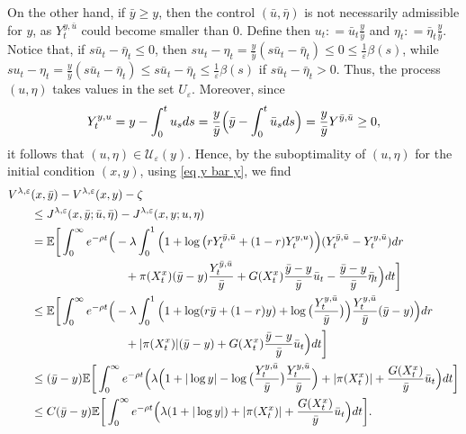 \documentclass[11pt]{amsart}
\theoremstyle{plain}
\def \dd{{\rm d}}
\numberwithin{equation}{section}
\begin{document}
On the other hand, if $\bar y \geq y$, then the control $( \bar u, \bar \eta)$ is not necessarily admissible for $y$, as $Y_t^{y,\bar u}$ could become smaller than 0. 
Define then $u_t: = \bar u_t \frac{y}{\bar y}$ and $\eta_t: = \bar \eta_t \frac{y}{\bar y}$. 
Notice that, if $s\bar u_t - \bar \eta _t \leq 0$, then $s u_t - \eta_t = \frac{y}{\bar y} ( s\bar u_t - \bar \eta_t) \leq 0 \leq \frac 1 \varepsilon \beta(s)$, while  $s u_t - \eta_t = \frac{y}{\bar y} ( s\bar u_t - \bar \eta_t) \leq s\bar u_t - \bar \eta_t \leq \frac 1 \varepsilon \beta(s)$ if $s\bar u_t - \bar \eta_t > 0$.
Thus, the process $(u,\eta) $ takes values in the set $ U _\varepsilon$. 
Moreover, since 
\begin{equation}\label{eq y bar y}
    Y^{y,u}_t = y- \int_0^t u_s \dd s = \frac{y}{\bar y} \Big( \bar y- \int_0^t \bar u_s \dd s \Big) = \frac{y}{\bar y}Y^{\bar y, \bar u} \geq 0,
\end{equation}
it follows that $(u,\eta) \in \mathcal U _\varepsilon (y)$.
Hence, by the suboptimality of $(u,\eta)$ for the initial condition $(x,y)$, using \eqref{eq y bar y}, we find
\begin{equation}\label{eq proof Lip y GIorgio}
\begin{aligned}
V^{\lambda, \varepsilon}&( x, \bar y) - V^{\lambda, \varepsilon}(x,y) - \zeta \\
& \leq J^{\lambda, \varepsilon}( x, \bar y;\bar u, \bar \eta ) - J^{\lambda, \varepsilon}(x,y;  u , \eta) \\
&  = \mathbb E  \bigg[\int_0^\infty e ^{-\rho t} \Big( - \lambda \int_0^1 \Big(1+ \log \big(  r  Y^{\bar y,\bar u}_t   + (1-r)Y^{y,  u}_t \big) \Big)  ( Y^{\bar y,\bar u}_t  - Y^{y, \bar u}_t ) \dd r \\ 
& \quad \quad \quad \quad \quad \quad \quad \quad  +\pi (X_t^{ x}) (\bar y - y) \frac{Y_t^{\bar y, \bar u}}{\bar y} + G (X_t^x) \frac{\bar y - y}{\bar y} \bar u _t - \frac{\bar y - y}{\bar y} \bar \eta_t \Big) \dd t \bigg]\\
 & \leq \mathbb E  \bigg[\int_0^\infty e ^{-\rho t} \Big(
 - \lambda \int_0^1 \Big(1+ \log ( r \bar y + (1-r) y ) + \log \big( \frac{Y^{y, \bar u}_t}{\bar y} \big) \Big) \frac{Y^{y, \bar u}_t}{\bar y} {(\bar y -y) }  \Big)  \dd r \\ 
& \quad \quad \quad \quad \quad \quad \quad \quad  + |\pi (X_t^{ x})| (\bar y - y)  +  G (X_t^x) \frac{\bar y - y}{\bar y} \bar u _t  \Big) \dd t \bigg]\\ 
& \leq (\bar y -y) \mathbb E  \bigg[\int_0^\infty e ^{-\rho t} \Big(
 \lambda  \Big( 1 + |\log y|  - \log \big( \frac{Y^{y, \bar u}_t}{\bar y} \big)  \frac{Y^{y, \bar u}_t}{\bar y} \Big) + |\pi (X_t^{ x})| + \frac{G (X_t^x)}{\bar y} \bar u _t  \Big) \dd t \bigg] \\
 & \leq C (\bar y -y) \mathbb E  \bigg[\int_0^\infty e ^{-\rho t} \Big(
 \lambda  (  1 + |\log y|  ) + |\pi (X_t^{ x})| + \frac{G (X_t^x)}{\bar y} \bar u _t  \Big) \dd t \bigg]. 
\end{aligned}
\end{equation}
\end{document}
